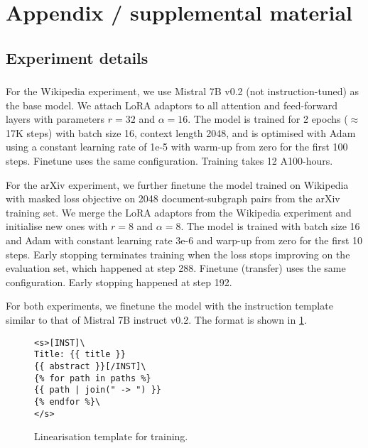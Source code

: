 \section{Appendix / supplemental material}

\subsection{Experiment details}  \label{appendix:exp-details}

\subsubsection{\name}  \label{appendix:training-details}

For the Wikipedia experiment, we use Mistral 7B v0.2 (not instruction-tuned) \cite{jiang2023mistral} as the base model. We attach LoRA \cite{hu2021lora} adaptors to all attention and feed-forward layers with parameters $r=32$ and $\alpha=16$. The model is trained for 2 epochs ($\approx$ 17K steps) with batch size 16, context length 2048, and is optimised with Adam using a constant learning rate of 1e-5 with warm-up from zero for the first 100 steps. Finetune uses the same configuration. Training takes 12 A100-hours.

For the arXiv experiment, we further finetune the model trained on Wikipedia with masked loss objective on 2048 document-subgraph pairs from the arXiv training set. We merge the LoRA adaptors from the Wikipedia experiment and initialise new ones with $r=8$ and $\alpha=8$. The model is trained with batch size 16 and Adam with constant learning rate 3e-6 and warp-up from zero for the first 10 steps. Early stopping terminates training when the loss stops improving on the evaluation set, which happened at step 288. Finetune (transfer) uses the same configuration. Early stopping happened at step 192.

For both experiments, we finetune the model with the instruction template similar to that of Mistral 7B instruct v0.2. The format is shown in \cref{fig:linearisation-template}.

\begin{figure}[h]
\centering
\begin{lstlisting}[frame=single]
<s>[INST]\
Title: {{ title }}
{{ abstract }}[/INST]\
{% for path in paths %}
{{ path | join(" -> ") }}
{% endfor %}\
</s>
\end{lstlisting}
\caption{Linearisation template for \name training.}
\label{fig:linearisation-template}
\end{figure}

